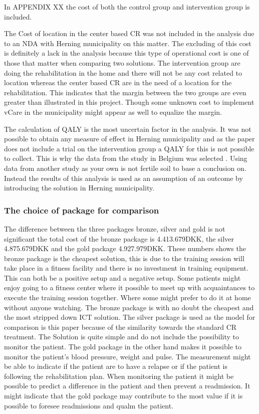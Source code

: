 In APPENDIX XX the cost of both the control group and intervention group is included.

The Cost of location in the center based CR was not included in the analysis due to an NDA with Herning municipality on this matter.  The excluding of this cost is definitely a lack in the analysis because this type of operational cost is one of those that matter when comparing two solutions. The intervention group are doing the rehabilitation in the home and there will not be any cost related to location whereas the center based CR are in the need of a location for the rehabilitation. This indicates that the margin between the two groups are even greater than illustrated in this project.  Though some unknown cost to implement vCare in the municipality might appear as well to equalize the margin. 

The calculation of QALY is the most uncertain factor in the analysis. It was not possible to obtain any measure of effect in Herning municipality and as the paper does not include a trial on the intervention group a QALY for this is not possible to collect. This is why the data from the study in Belgium was selected \cite{costeffect}. Using data from another study as your own is not fertile soil to base a conclusion on. Instead the results of this analysis is used as an assumption of an outcome by introducing the solution in Herning municipality. 


\subsubsection{The choice of package for comparison}

The difference between the three packages bronze, silver and gold is not significant the total cost of the bronze package is 4.413.679DKK, the silver 4.875.679DKK and the gold package 4.927.979DKK. These numbers shows the bronze package is the cheapest solution, this is due to the training session will take place in a fitness facility and there is no investment in training equipment. This can both be a positive setup and a negative setup. Some patients might enjoy going to a fitness center where it possible to meet up with acquaintances to execute the training session together. Where some might prefer to do it at home without anyone watching. The bronze package is with no doubt the cheapest and the most stripped down ICT solution. The silver package is used as the model for comparison is this paper because of the similarity towards the standard CR treatment. The Solution is quite simple and do not include the possibility to monitor the patient. The gold package in the other hand makes it possible to monitor the patient's blood pressure, weight and pulse.  The measurement might be able to indicate if the patient are to have a relapse or if the patient is following the rehabilitation plan. When monitoring the patient it might be possible to predict a difference in the patient and then prevent a readmission. %
It might indicate that the gold package may contribute to the most value if it is possible to foresee readmissions and qualm the patient.

